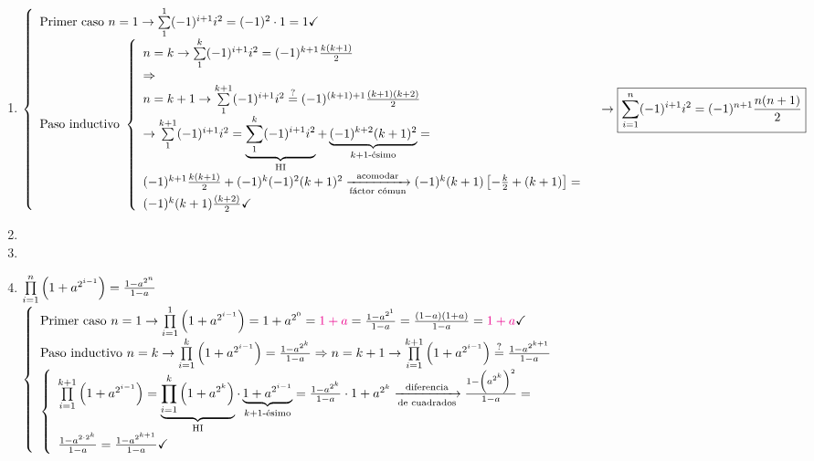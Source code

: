 \documentclass[12pt,a4paper, spanish]{article}
\begin{document}
\ejercicio
\hacer

\ejercicio
\begin{enumerate}[label=\roman*)]
	\item $\llave{ l }{
			      \text{Primer caso } n = 1 \to \sumatoria{1}{1} (-1)^{i+1} i^2 = (-1)^2 \cdot 1 = 1 \checkmark\\
			      \text{Paso inductivo }
			      \llave{ l }{
				      n = k \to \sumatoria{1}{k} (-1)^{i+1} i^2 = (-1)^{k+1} \frac{k(k+1)}{2} \\
				      \entonces\\
				      n = k+1 \to \sumatoria{1}{k+1}  (-1)^{i+1} i^2 \eq?= (-1)^{(k+1)+1} \frac{(k+1)(k+2)}{2}\\
				      \to \sumatoria{1}{k+1}  (-1)^{i+1} i^2 =
				      \HI{
					      \sumatoria{1}{k} (-1)^{i+1} i^2
				      } +
				      \kmasuno{
					      (-1)^{k+2} (k+1)^2
				      } =\\
				      (-1)^{k+1} \frac{k(k+1)}{2} + (-1)^k (-1)^2 (k+1)^2 \flecha{acomodar}[fáctor cómun] (-1)^k (k+1)\left[ -\frac{k}{2} + (k+1) \right] =\\
				      (-1)^k (k+1)\frac{(k+2)}{2} \checkmark
			      }
		      }\\ \to
		      \boxed{\sumatoria{i=1}{n} (-1)^{i+1} i^2 = (-1)^{n+1} \frac{n(n+1)}{2}}
	      $

	\item
	      \hacer

	\item
	      \hacer

	\item
	      $\prod\limits_{i=1}^{n} \left(  1 + a^{2^{i-1}}  \right) = \frac{1-a^{2^n}}{1-a}$\\
	      $\llave{l}{
		      \text{Primer caso } n = 1 \to \productoria{i=1}{1} \parentesis{ 1 + a^{2^{i-1}} } = 1 + a^{2^0} = \magenta{$1 + a$} = \frac{1-a^{2^1}}{1 - a} = \frac{(1-a)(1+a)}{1-a} = \magenta{$1 + a$} \checkmark \\
		      \text{Paso inductivo } n = k \to \productoria{i=1}{k} \parentesis{ 1 + a^{2^{i-1}} } = \frac{1-a^{2^k}}{1-a} \entonces n = k+1 \to  \productoria{i=1}{k+1} \parentesis{ 1 + a^{2^{i-1}} } \eq?= \frac{1-a^{2^{k+1}}}{1-a}\\
		      \llave{l}{
		      \productoria{i=1}{k+1} \parentesis{ 1 + a^{2^{i-1}} } =
		      \HI{
			      \productoria{i=1}{k} \parentesis{ 1 + a^{2^k}}
		      } \cdot
		      \kmasuno{
			      1 + a^{2^{i-1}}
		      }  =
		      \frac{1-a^{2^k}}{1-a} \cdot 1 + a^{2^k} \flecha{diferencia}[de cuadrados] \frac{1 - \parentesis{ a^{2^k}}^2}{1-a} =\\
		      \frac{1 - a^{2 \cdot 2^k}}{1-a} = \frac{1 - a^{2^{k+1}}}{1-a}\checkmark
		      }
		      }
	      $




\end{enumerate}
\end{document}
